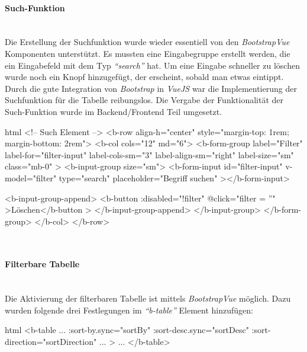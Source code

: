 \paragraph{Such-Funktion}
~\\
Die Erstellung der Suchfunktion wurde wieder essentiell von den \textit{BootstrapVue} Komponenten unterstützt. Es mussten eine Eingabegruppe erstellt werden, die ein Eingabefeld mit dem Typ \textit{\enquote{search}} hat. Um eine Eingabe schneller zu löschen wurde noch ein Knopf hinzugefügt, der erscheint, sobald man etwas eintippt. Durch die gute Integration von \textit{Bootstrap} in \textit{VueJS} war die Implementierung der Suchfunktion für die Tabelle reibungslos. Die Vergabe der Funktionalität der Such-Funktion wurde im Backend/Frontend Teil umgesetzt.
\begin{code}{html}
	<!-- Such Element -->
    <b-row align-h="center" style="margin-top: 1rem; margin-bottom: 2rem">
      <b-col cols="12" md="6">
        <b-form-group
          label="Filter"
          label-for="filter-input"
          label-cols-sm="3"
          label-align-sm="right"
          label-size="sm"
          class="mb-0"
        >
          <b-input-group size="sm">
            <b-form-input
              id="filter-input"
              v-model="filter"
              type="search"
              placeholder="Begriff suchen"
            ></b-form-input>

            <b-input-group-append>
              <b-button :disabled="!filter" @click="filter = ''"
                >Löschen</b-button
              >
            </b-input-group-append>
          </b-input-group>
        </b-form-group>
      </b-col>
    </b-row>
\end{code}
	\label{list:antragsearchcode} ~\\
\paragraph{Filterbare Tabelle}
~\\
Die Aktivierung der filterbaren Tabelle ist mittels \textit{BootstrapVue} möglich. Dazu wurden folgende drei Festlegungen im \textit{\enquote{b-table}} Element hinzufügen:
\begin{code}{html}
	<b-table
		...
		:sort-by.sync="sortBy"
      	:sort-desc.sync="sortDesc"
      	:sort-direction="sortDirection"
		...
	>
	...
	</b-table>
\end{code}
	\label{list:antragfiltercode} ~\\

